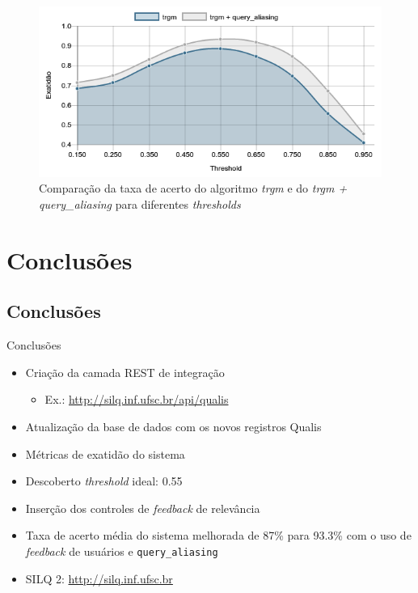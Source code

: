 \documentclass{beamer}
\begin{document}
\begin{frame}
  \begin{figure}
    \includegraphics[width=\textwidth]{figuras/avaliacao-algoritmos.png}
    \caption{Comparação da taxa de acerto do algoritmo \textit{trgm} e do \textit{trgm + query\_aliasing} para diferentes \textit{thresholds}}
  \end{figure}
\end{frame}

\section{Conclusões}
\subsection*{Conclusões}

\begin{frame}{Conclusões}
  \begin{itemize}[<+->]
    \item Criação da camada REST de integração
    \begin{itemize}[<1->]
      \item Ex.: \url{http://silq.inf.ufsc.br/api/qualis}
    \end{itemize}
    \item Atualização da base de dados com os novos registros Qualis
    \item Métricas de exatidão do sistema
    \item Descoberto \textit{threshold} ideal: 0.55
    \item Inserção dos controles de \textit{feedback} de relevância
    \item Taxa de acerto média do sistema melhorada de 87\% para 93.3\% com o uso de \textit{feedback} de usuários e \texttt{query\_aliasing}
    \item SILQ 2: \url{http://silq.inf.ufsc.br}
  \end{itemize}
\end{frame}
\end{document}
